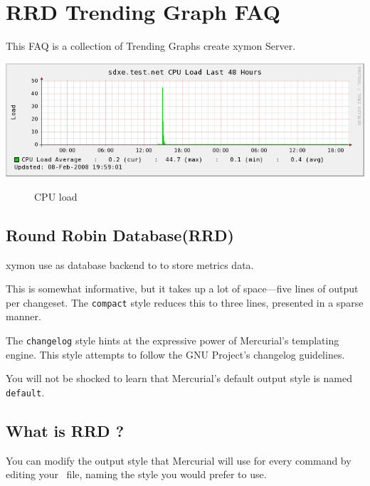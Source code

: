 \chapter{RRD Trending Graph FAQ}
\label{chap:xymongraph}


This FAQ is a collection of Trending Graphs create xymon Server.

\includegraphics[scale=0.6]{./xymongraph.png} 


\begin{figure}[htb]
  \centering
  \caption{CPU load }
  \label{fig:cpu:load}
\end{figure}


\section{Round Robin Database(RRD) }
\label{sec:style}

xymon use  as database backend to to store metrics data.



This is somewhat informative, but it takes up a lot of space---five
lines of output per changeset.  The \texttt{compact} style reduces
this to three lines, presented in a sparse manner.


The \texttt{changelog} style hints at the expressive power of
Mercurial's templating engine.  This style attempts to follow the GNU
Project's changelog guidelines\cite{web:changelog}.


You will not be shocked to learn that Mercurial's default output style
is named \texttt{default}.

\section{What is RRD ?}

You can modify the output style that Mercurial will use for every
command by editing your \hgrc\ file, naming the style you would
prefer to use.

